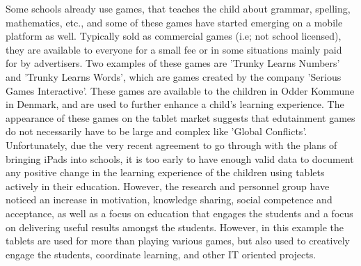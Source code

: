 Some schools already use games, that teaches the child about grammar, spelling, mathematics, etc., and some of these games have started emerging on a mobile platform as well.
Typically sold as commercial games (i.e; not school licensed), they are available to everyone for a small fee or in some situations mainly paid for by advertisers.
Two examples of these games are 'Trunky Learns Numbers' and 'Trunky Learns Words', which are games created by the company 'Serious Games Interactive'.
These games are available to the children in Odder Kommune in Denmark, and are used to further enhance a child's learning experience.\cite{odderipad}
The appearance of these games on the tablet market suggests that edutainment games do not necessarily have to be large and complex like 'Global Conflicts'.
Unfortunately, due the very recent agreement to go through with the plans of bringing iPads into schools, it is too early to have enough valid data to document any positive change in the learning experience of the children using tablets actively in their education.
However, the research and personnel group have noticed an increase in motivation, knowledge sharing, social competence and acceptance, as well as a focus on education that engages the students and a focus on delivering useful results amongst the students.\cite{odderipadpjece}
However, in this example the tablets are used for more than playing various games, but also used to creatively engage the students, coordinate learning, and other IT oriented projects.\cite{odderipadpjece}
